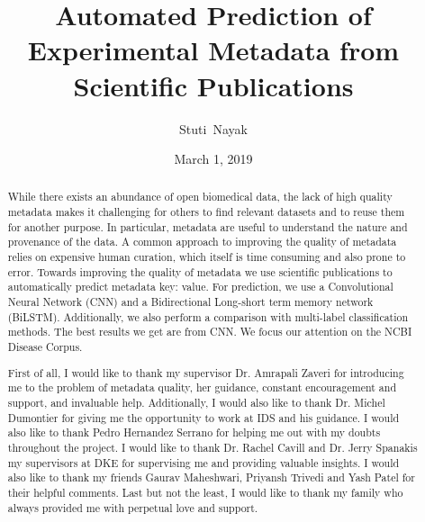 \documentclass[10pt]{reportMaster}
\title{Automated Prediction of Experimental Metadata from Scientific Publications}
\author{Stuti\ Nayak}
\date{March 1, 2019}
\begin{document}
\maketitle
\begin{abstract}
While there exists an abundance of open biomedical data, the lack of high quality metadata makes it challenging for others to find relevant datasets and to reuse them for another purpose. In particular, metadata are useful to understand the nature and provenance of the data. A common approach to improving the quality of metadata relies on expensive human curation, which itself is time consuming and also prone to error. Towards improving the quality of metadata we use scientific publications to automatically predict metadata key: value. For prediction, we use a Convolutional Neural Network (CNN) and a Bidirectional Long-short term memory network (BiLSTM). Additionally, we also perform a comparison with multi-label classification methods. The best results we get are from CNN. We focus our attention on the NCBI Disease Corpus. 
\end{abstract}

\renewcommand{\abstractname}{Acknowledgements}
\begin{abstract}
First of all, I would like to thank my supervisor Dr. Amrapali Zaveri for introducing me to the problem of metadata quality, her guidance, constant encouragement and support, and invaluable help. Additionally, I would also like to thank Dr. Michel Dumontier for giving me the opportunity to work at IDS and his guidance. I would also like to thank Pedro Hernandez Serrano for helping me out with my doubts throughout the project. I would like to thank Dr. Rachel Cavill and Dr. Jerry Spanakis my supervisors at DKE for supervising me and providing valuable insights. I would also like to thank my friends Gaurav Maheshwari, Priyansh Trivedi and Yash Patel for their helpful comments. Last but not the least, I would like to thank my family who always provided me with perpetual love and support. 
 
 
\end{abstract}

\tableofcontents

\listoffigures
 
\listoftables








%

%




\end{document}
